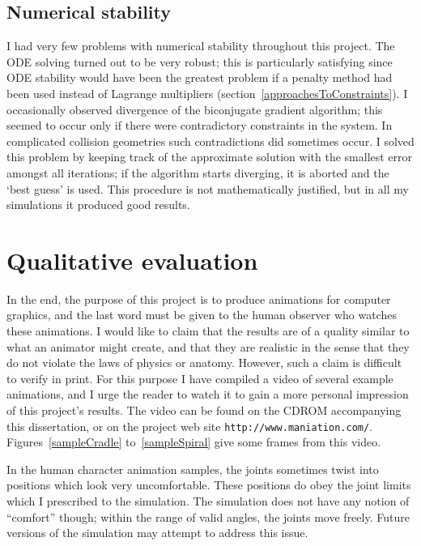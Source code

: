 \subsection{Numerical stability}

I had very few problems with numerical stability throughout this project. The ODE solving turned
out to be very robust; this is particularly satisfying since ODE stability would have been the
greatest problem if a penalty method had been used instead of Lagrange multipliers
(section~\ref{approachesToConstraints}). I occasionally observed divergence of the biconjugate
gradient algorithm; this seemed to occur only if there were contradictory constraints in the
system. In complicated collision geometries such contradictions did sometimes occur. I solved this
problem by keeping track of the approximate solution with the smallest error amongst all
iterations; if the algorithm starts diverging, it is aborted and the `best guess' is used.
This procedure is not mathematically justified, but in all my simulations it produced good results.


\section{Qualitative evaluation}

In the end, the purpose of this project is to produce animations for computer graphics, and the
last word must be given to the human observer who watches these animations. I would like to claim
that the results are of a quality similar to what an animator might create, and that they are
realistic in the sense that they do not violate the laws of physics or anatomy. However, such a
claim is difficult to verify in print. For this purpose I have compiled a video of several
example animations, and I urge the reader to watch it to gain a more personal impression of this
project's results. The video can be found on the CDROM accompanying this dissertation, or on the
project web site \texttt{http://www.maniation.com/}. Figures~\ref{sampleCradle}
to~\ref{sampleSpiral} give some frames from this video.

In the human character animation samples, the joints sometimes twist into positions which look
very uncomfortable. These positions do obey the joint limits which I prescribed to the simulation.
The simulation does not have any notion of ``comfort'' though; within the range of valid angles,
the joints move freely. Future versions of the simulation may attempt to address this issue.

